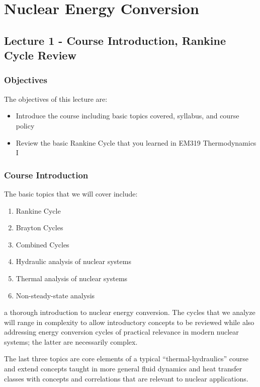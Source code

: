 \documentclass{tufte-book}
\begin{document}
\part{Nuclear Energy Conversion}
\chapter{Lecture 1 - Course Introduction, Rankine Cycle Review}
\label{ch:lec1}%
\section{Objectives}
The objectives of this lecture are:
\begin{itemize}
\item Introduce the course including basic topics covered, syllabus, and course policy
\item Review the basic Rankine Cycle that you learned in EM319 Thermodynamics I
\end{itemize}

\section{Course Introduction}
The basic topics that we will cover include:
\begin{enumerate}
\item Rankine Cycle 
\item Brayton Cycles
\item Combined Cycles 
\item Hydraulic analysis of nuclear systems
\item Thermal analysis of nuclear systems
\item Non-steady-state analysis 
\end{enumerate}
 a thorough introduction to nuclear energy conversion.  The cycles that we analyze will range in complexity to allow introductory concepts to be reviewed while also addressing energy conversion cycles of practical relevance in modern nuclear systems; the latter are necessarily complex.

The last three topics are core elements of a typical ``thermal-hydraulics'' course and extend concepts taught in more general fluid dynamics and heat transfer classes with concepts and correlations that are relevant to nuclear applications.
\end{document}
